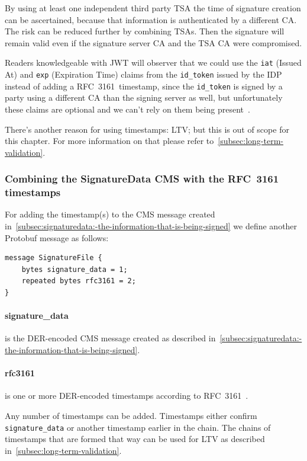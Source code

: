 By using at least one independent third party \gls{TSA} the time of signature creation can be ascertained,
because that information is authenticated by a different \gls{CA}.
The risk can be reduced further by combining \gls{TSA}s.
Then the signature will remain valid even if the signature server \gls{CA} and the \gls{TSA} \gls{CA} were compromised.

Readers knowledgeable with \gls{JWT} will observer that we could use the \texttt{iat} (Issued At) and \texttt{exp} (Expiration Time)
claims from the \texttt{id\_token} issued by the \gls{IDP} instead of adding a RFC~3161~timestamp,
since the \texttt{id\_token} is signed by a party using a different \gls{CA} than the signing server as well,
but unfortunately these claims are optional and we can't rely on them being present~\cite[Sections 4.1.4 and 4.1.6]{rfc7519}.

There's another reason for using timestamps: \glsdesc{LTV}; but this is out of scope for this chapter.
For more information on that please refer to~\ref{subsec:long-term-validation}.

\subsubsection{Combining the SignatureData CMS with the RFC~3161 timestamps}
For adding the timestamp(s) to the \gls{CMS} message created in~\ref{subsec:signaturedata:-the-information-that-is-being-signed}
we define another Protobuf message as follows:

\begin{lstlisting}[caption={SignatureFile message}, captionpos=b, label={lst:signaturefileschema}]
message SignatureFile {
    bytes signature_data = 1;
    repeated bytes rfc3161 = 2;
}
\end{lstlisting}

\paragraph{signature\_data} is the \gls{DER}-encoded \gls{CMS} message created as described in~\ref{subsec:signaturedata:-the-information-that-is-being-signed}.
\paragraph{rfc3161} is one or more \gls{DER}-encoded timestamps according to RFC~3161~\cite{rfc3161}.

Any number of timestamps can be added.
Timestamps either confirm \texttt{signature\_data} or another timestamp earlier in the chain.
The chains of timestamps that are formed that way can be used for \gls{LTV} as described in~\ref{subsec:long-term-validation}.

